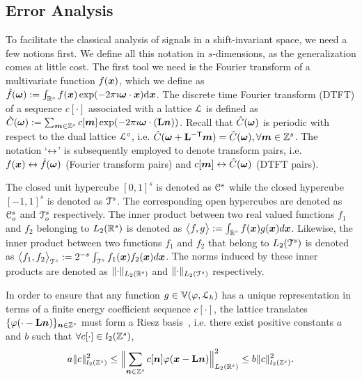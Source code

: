 \subsection{Error Analysis} \label{sec:sis_error}
To facilitate the classical analysis of signals in a shift-invariant space, we need a few notions first. 
We define all this notation in $s$-dimensions, as the generalization comes at little cost.
The first tool we need is the Fourier transform of a multivariate function $f(\boldsymbol{x})$, which we define as $ \hat{f}(\boldsymbol{\omega}) := \int_{\mathbb{R}^s} f(\boldsymbol{x}) \exp(-2\pi \imath \boldsymbol{\omega} \cdot \boldsymbol{x}) \mathrm{d}\boldsymbol{x} $. 
The discrete time Fourier transform (DTFT) of a sequence $c[\cdot]$ associated with a lattice $\mathcal{L}$ is defined as $\hat{C}(\boldsymbol{\omega}) := \sum_{\boldsymbol{m}  \in \mathbb{Z}^s} c[\boldsymbol{m}] \exp(-2 \pi \imath \boldsymbol{\omega} \cdot (\mathbf{L}\boldsymbol{n}))$. Recall that $\hat{C}(\boldsymbol{\omega})$ is periodic with respect to the dual lattice $\mathcal{L}^{\circ}$, i.e. $\hat{C}(\boldsymbol{\omega} + {\mathbf{L}}^{\mathsf{-T}} \boldsymbol{m}) = \hat{C}(\boldsymbol{\omega}), \forall \boldsymbol{m} \in \mathbb{Z}^s$. 
The notation `$\leftrightarrow$' is subsequently employed to denote transform pairs, i.e. $f(\boldsymbol{x}) \leftrightarrow \hat{f}(\boldsymbol{\omega})$ (Fourier transform pairs) and $c[\boldsymbol{m}] \leftrightarrow \hat{C}(\boldsymbol{\omega})$ (DTFT pairs).

The closed unit hypercube $[0,1]^s$ is denoted as $\mathcal{C}^s$ while the closed hypercube $[-1,1]^s$ is denoted as $\mathcal{T}^s$. 
The corresponding open hypercubes are denoted as $\mathcal{C}_o^s$ and $\mathcal{T}_o^s$ respectively.
The inner product between two real valued functions $f_1$ and $f_2$ belonging to $L_2(\mathbb{R}^s)$ is denoted as $\bigl \langle f , g \bigr \rangle := \int_{\mathbb{R}^s} f(\boldsymbol{x}) g(\boldsymbol{x}) d\boldsymbol{x}$. 
Likewise, the inner product between two functions $f_1$ and $f_2$ that belong to $L_2(\mathcal{T}^s)$ is denoted as $\bigl \langle f_1 , f_2 \bigr \rangle_{\mathcal{T}^s} := {2^{-s}} \int_{\mathcal{T}^s} f_1(\boldsymbol{x}) f_2(\boldsymbol{x}) d\boldsymbol{x}$. 
The norms induced by these inner products are denoted as $\lVert \cdot \rVert_{L_2(\mathbb{R}^s)}$ and $\lVert \cdot \rVert_{L_2(\mathcal{T}^s)}$ respectively.

In order to ensure that any function $g \in \mathbb{V}({\varphi},{\mathcal{L}_h})$ has a unique representation in terms of a finite energy coefficient sequence $c[\cdot]$, the lattice translates $\{\varphi(\cdot - \mathbf{L}\boldsymbol{n})\}_{\boldsymbol{n}  \in \mathbb{Z}^s}$ must form a Riesz basis~\cite{kreyszig89}, i.e. there exist positive constants $a$ and $b$ such that $\forall c[\cdot] \in l_2(\mathbb{Z}^s)$,
\begin{equation*}
  a \lVert c\rVert^2_{l_2(\mathbb{Z}^s)} \le \Bigl\lVert \sum_{\boldsymbol{n} \in \mathbb{Z}^s}
  c[\boldsymbol{n}] \varphi(\boldsymbol{x} - \mathbf{L}\boldsymbol{n}) \Bigr\rVert_{L_2(\mathbb{R}^s)}^2 \le b
	\lVert c\rVert^2_{l_2(\mathbb{Z}^s)}.
\end{equation*}



